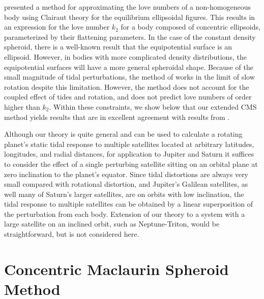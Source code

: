 \citet{folonier2015} presented a method for approximating the love numbers of a
non-homogeneous body using Clairaut theory for the equilibrium ellipsoidal
figures.  This results in an expression for the love number $k_2$ for a body
composed of concentric ellipsoids, parameterized by their flattening
parameters. In the case of the constant density spheroid, there is a well-known
result that the equipotential surface is an ellipsoid. However, in bodies with
more complicated density distributions, the equipotential surfaces will have a
more general spheroidal shape.  Because of the small magnitude of tidal
perturbations, the method of \citet{folonier2015} works in the limit of slow
rotation despite this limitation.  However, the method does not account for the
coupled effect of tides and rotation, and does not predict love numbers of
order higher than $k_2$.  Within these constraints, we show below that our
extended CMS method yields results that are in excellent agreement with results
from \citet{folonier2015}.

Although our theory is quite general and can be used to calculate a rotating
planet's static tidal response to multiple satellites located at arbitrary
latitudes, longitudes, and radial distances, for application to Jupiter and
Saturn it suffices to consider the effect of a single perturbing satellite
sitting on an orbital plane at zero inclination to the planet's equator.  Since
tidal distortions are always very small compared with rotational distortion,
and Jupiter's Galilean satellites, as well many of Saturn's larger satellites,
are on orbits with low inclination, the tidal response to multiple satellites
can be obtained by a linear superposition of the perturbation from each body.
Extension of our theory to a system with a large satellite on an inclined
orbit, such as Neptune-Triton, would be straightforward, but is not considered
here.

\section{Concentric Maclaurin Spheroid Method }

